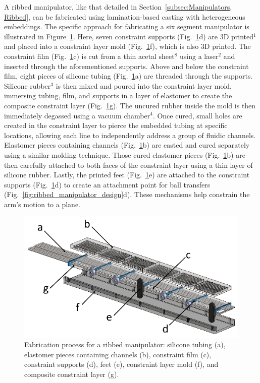 A ribbed manipulator, like that detailed in Section~\ref{subsec:Manipulators, Ribbed}, can be fabricated using lamination-based casting with heterogeneous embeddings.
%
The specific approach for fabricating a six segment manipulator is illustrated in Figure~\ref{fig:ribbed fab process}.
Here, seven constraint supports (Fig.~\ref{fig:ribbed fab process}d) are 3D printed$^1$ and placed into a constraint layer mold (Fig.~\ref{fig:ribbed fab process}f), which is also 3D printed.
The constraint film (Fig.~\ref{fig:ribbed fab process}c) is cut from a thin acetal sheet$^8$ using a laser$^2$ and inserted through the aforementioned supports.
Above and below the constraint film, eight pieces of silicone tubing (Fig.~\ref{fig:ribbed fab process}a) are threaded through the supports.
Silicone rubber$^3$ is then mixed and poured into the constraint layer mold, immersing tubing, film, and supports in a layer of elastomer to create the composite constraint layer (Fig.~\ref{fig:ribbed fab process}g).
The uncured rubber inside the mold is then immediately degassed using a vacuum chamber$^4$.
Once cured, small holes are created in the constraint layer to pierce the embedded tubing at specific locations, allowing each line to independently address a group of fluidic channels.
Elastomer pieces containing channels (Fig.~\ref{fig:ribbed fab process}b) are casted and cured separately using a similar molding technique.
Those cured elastomer pieces (Fig.~\ref{fig:ribbed fab process}b) are then carefully attached to both faces of the constraint layer using a thin layer of silicone rubber.
Lastly, the printed feet (Fig.~\ref{fig:ribbed fab process}e) are attached to the constraint supports (Fig.~\ref{fig:ribbed fab process}d) to create an attachment point for ball transfers (Fig.~\ref{fig:ribbed_manipulator_design}d).
These mechanisms help constrain the arm's motion to a plane.
\begin{figure}[htb]
\includegraphics[width=\columnwidth]{figures/fabrication/fab_ribbed_process.eps}
\caption[Fabrication process for a ribbed manipulator morphology]{Fabrication process for a ribbed manipulator: silicone tubing (a), elastomer pieces containing channels (b), constraint film (c), constraint supports (d), feet (e), constraint layer mold (f), and composite constraint layer (g).}
\label{fig:ribbed fab process}
\end{figure}

